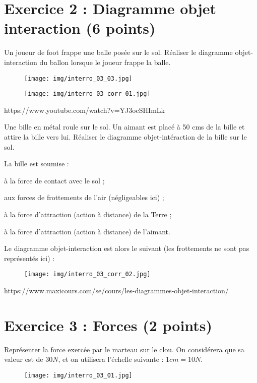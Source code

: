 \documentclass[answers]{exam}
\begin{document}
\section*{Exercice 2 : Diagramme objet interaction (6 points)}
\begin{questions}
  \question[3] Un joueur de foot frappe une balle posée sur le sol. Réaliser le diagramme objet-interaction du ballon lorsque le joueur frappe la balle. 
  \begin{figure}[H]
    \centering
    \texttt{[image: img/interro\_03\_03.jpg]}
  \end{figure}
  \begin{solution}
    \begin{figure}[H]
      \centering
      \texttt{[image: img/interro\_03\_corr\_01.jpg]}
    \end{figure}
    https://www.youtube.com/watch?v=YJ3ocSHImLk
  \end{solution}

  \question[3] Une bille en métal roule sur le sol. Un aimant est placé à 50 cms de la bille et attire la bille vers lui. Réaliser le diagramme objet-intéraction de la bille sur le sol.
  \begin{solution}

    La bille est soumise :
\begin{compactitem}
    \item à la force de contact avec le sol ;
    \item aux forces de frottements de l'air (négligeables ici) ;
    \item à la force d'attraction (action à distance) de la Terre ;
    \item à la force d'attraction (action à distance) de l'aimant.
\end{compactitem}

Le diagramme objet-interaction est alors le suivant (les frottements ne sont pas représentés ici) :

    \begin{figure}[H]
      \centering
      \texttt{[image: img/interro\_03\_corr\_02.jpg]}
    \end{figure}
    https://www.maxicours.com/se/cours/les-diagrammes-objet-interaction/
  \end{solution}
\end{questions}

\section*{Exercice 3 : Forces (2 points)}
\begin{questions}
  \question[2] Représenter la force exercée par le marteau sur le clou. On considérera que sa valeur est de $30 N$, et on utilisera l'échelle suivante : $1cm = 10N$.
  \begin{figure}[H]
    \centering
    \texttt{[image: img/interro\_03\_01.jpg]}
  \end{figure}
\end{questions}
\end{document}
